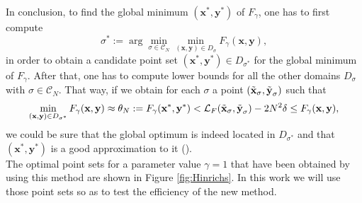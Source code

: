 In conclusion, to find the global minimum $(\textbf{x}^*,\textbf{y}^*)$ of $F_{\gamma}$, one has to first compute
\begin{equation*}
    \sigma^* := \arg\min_{\sigma \in \mathcal{C}_N}{\min_{(\textbf{x},\textbf{y})\in D_{\sigma}}{F_{\gamma}(\textbf{x},\textbf{y})}},
\end{equation*}
in order to obtain a candidate point set $(\textbf{x}^*,\textbf{y}^*)\in D_{\sigma^*}$ for the global minimum of $F_{\gamma}$. After that, one has to compute lower bounds for all the other domains $D_{\sigma}$ with $\sigma\in \mathcal{C}_N$. That way, if we obtain for each $\sigma$ a point $(\Tilde{\textbf{x}}_{\sigma},\Tilde{\textbf{y}}_{\sigma})$ such that
\begin{equation*}
    \min_{(\textbf{x},\textbf{y})\in D_{\sigma^*}}{F_{\gamma}(\textbf{x},\textbf{y})} \approx \theta_N := F_{\gamma}(\textbf{x}^*,\textbf{y}^*) < \mathcal{L}_F(\Tilde{\textbf{x}}_{\sigma},\Tilde{\textbf{y}}_{\sigma}) - 2N^2\delta \leq F_{\gamma}(\textbf{x},\textbf{y}),
\end{equation*}
we could be sure that the global optimum is indeed located in $D_{\sigma^*}$ and that $(\textbf{x}^*,\textbf{y}^*)$ is a good approximation to it (\cite{Hinrichs.pdf}).\\


The optimal point sets for a parameter value $\gamma=1$ that have been obtained by \cite{Hinrichs.pdf} using this method are shown in Figure \ref{fig:Hinrichs}. In this work we will use those point sets so as to test the efficiency of the new method.\\



